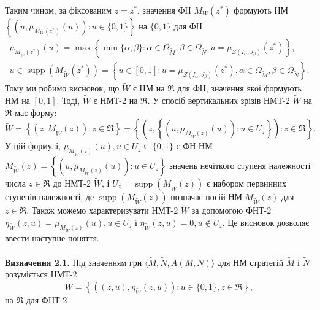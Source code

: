 \documentclass[14pt, a4paper, oneside]{extarticle}
\numberwithin{equation}{section}
\begin{document}
Таким чином, за фіксованим $z=z^{*}$, значення ФН $M_{W}\left(z^{*}\right)$ формують НМ $\left\{\left(u, \mu_{M_{W}\left(z^{*}\right)}(u)\right): u \in\{0,1\}\right\}$ на $\{0,1\}$ для ФН
\begin{equation*}
\begin{array}{r}
\mu_{M_{\tilde{W}}\left(z^{*}\right)}(u)=\max \left\{\min \{\alpha, \beta\}: \alpha \in \Omega_{\tilde{M}}, \beta \in \Omega_{\tilde{N}}, u=\mu_{Z\left(I_{\alpha}, J_{\beta}\right)}\left(z^{*}\right)\right\}, \\
u \in \operatorname{supp}\left(M_{\tilde{W}}\left(z^{*}\right)\right)=\left\{u \in[0,1]: u=\mu_{Z\left(I_{\alpha}, J_{\beta}\right)}\left(z^{*}\right), \alpha \in \Omega_{\tilde{M}}, \beta \in \Omega_{\tilde{N}}\right\}.
\end{array}
\end{equation*}
Тому ми робимо висновок, що $\tilde{W}$ є НМ на $\Re$ для ФН, значення якої формують НМ на $[0,1]$. Тоді, $\tilde{W}$ є НМТ-2 на $\Re$. У спосіб вертикальних зрізів НМТ-2 $\tilde{W}$ на $\Re$ має форму:
\begin{equation*}
\tilde{W}=\left\{\left(z, M_{\tilde{W}}(z)\right): z \in \Re\right\}=\left\{\left(z,\left\{\left(u, \mu_{M_{\tilde{W}}(z)}(u)\right): u \in U_{z}\right\}\right): z \in \Re\right\}.
\end{equation*}
У цій формулі, $\mu_{M_{\tilde{W}}(z)}(u), u \in U_{z} \subseteq\{0,1\}$ є ФН НМ\\ $M_{\tilde{W}}(z) = \left\{\left(u, \mu_{M_{\tilde{W}}(z)}(u)\right): u \in U_{z}\right\}$ значень нечіткого ступеня належності числа $z \in \Re$ до НМТ-2 $\tilde{W}$, і $U_{z}=\operatorname{supp}\left(M_{\tilde{W}}(z)\right)$ є набором первинних ступенів належності, де $\operatorname{supp}\left(M_{\tilde{W}}(z)\right)$ позначає носій НМ $M_{\tilde{W}}(z)$ для $z \in \Re$. Також можемо характеризувати НМТ-2 $\tilde{W}$ за допомогою ФНТ-2 $\eta_{\tilde{W}}(z, u)=\mu_{M_{\tilde{W}}(z)}(u), u \in U_{z}$ і $\eta_{\tilde{W}}(z, u)=0, u \notin U_{z}$. Це висновок дозволяє ввести наступне поняття.
\\
\\

\textbf{Визначення 2.1.} Під значенням гри $\langle\tilde{M}, \tilde{N}, A(M, N)\rangle$ для НМ стратегій $\tilde{M}$ і $\tilde{N}$ розуміється НМТ-2
\begin{equation*}
\tilde{W}=\left\{\left((z, u), \eta_{\tilde{W}}(z, u)\right): u \in\{0,1\}, z \in \Re\right\},
\end{equation*}
на $\Re$ для ФНТ-2
\end{document}
